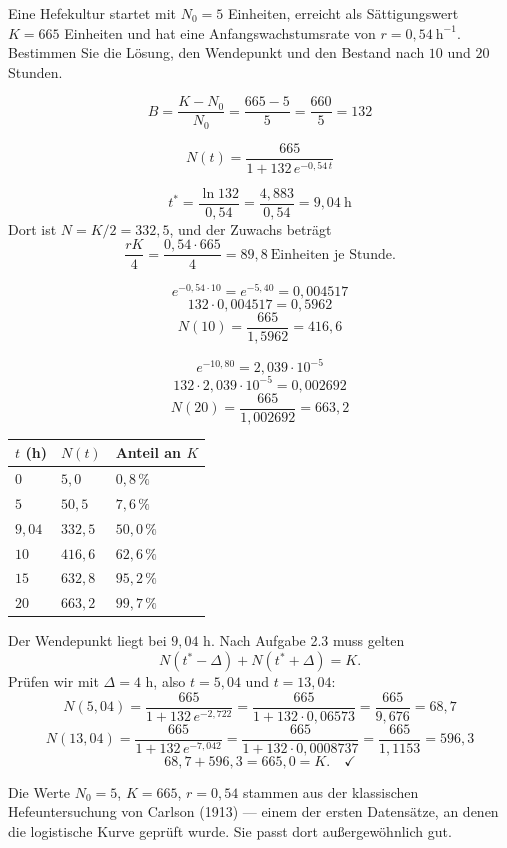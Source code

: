 \begin{aufgabe}
Eine Hefekultur startet mit $N_0 = 5$ Einheiten, erreicht als Sättigungswert $K = 665$ Einheiten und hat eine Anfangswachstumsrate von $r = 0{,}54\ \mathrm{h}^{-1}$. Bestimmen Sie die Lösung, den Wendepunkt und den Bestand nach $10$ und $20$ Stunden.

\loesung
{}
\[ B = \frac{K-N_0}{N_0} = \frac{665-5}{5} = \frac{660}{5} = 132 \]

\[ N(t) = \frac{665}{1 + 132\,e^{-0{,}54\,t}} \]

\[ t^{*} = \frac{\ln 132}{0{,}54} = \frac{4{,}883}{0{,}54} = 9{,}04\ \text{h} \]
Dort ist $N = K/2 = 332{,}5$, und der Zuwachs beträgt
\[ \frac{rK}{4} = \frac{0{,}54 \cdot 665}{4} = 89{,}8 \ \text{Einheiten je Stunde} . \]

\[ e^{-0{,}54 \cdot 10} = e^{-5{,}40} = 0{,}004517 \]
\[ 132 \cdot 0{,}004517 = 0{,}5962 \]
\[ N(10) = \frac{665}{1{,}5962} = 416{,}6 \]

\[ e^{-10{,}80} = 2{,}039\cdot10^{-5} \]
\[ 132 \cdot 2{,}039\cdot10^{-5} = 0{,}002692 \]
\[ N(20) = \frac{665}{1{,}002692} = 663{,}2 \]

\begin{center}
\renewcommand{\arraystretch}{1.45}
\begin{tabular}{@{}P{1.8cm}P{2.0cm}P{2.6cm}@{}}
\toprule
$t$ (h) & $N(t)$ & \textbf{Anteil an $K$}\\
\midrule
$0$ & $5{,}0$ & $0{,}8\,\%$\\
$5$ & $50{,}5$ & $7{,}6\,\%$\\
$9{,}04$ & $332{,}5$ & $50{,}0\,\%$\\
$10$ & $416{,}6$ & $62{,}6\,\%$\\
$15$ & $632{,}8$ & $95{,}2\,\%$\\
$20$ & $663{,}2$ & $99{,}7\,\%$\\
\bottomrule
\end{tabular}
\end{center}

Der Wendepunkt liegt bei $9{,}04$ h. Nach Aufgabe 2.3 muss gelten
\[ N(t^*-\Delta) + N(t^*+\Delta) = K . \]
Prüfen wir mit $\Delta = 4$ h, also $t = 5{,}04$ und $t = 13{,}04$:
\[ N(5{,}04) = \frac{665}{1+132\,e^{-2{,}722}} = \frac{665}{1+132\cdot0{,}06573} = \frac{665}{9{,}676} = 68{,}7 \]
\[ N(13{,}04) = \frac{665}{1+132\,e^{-7{,}042}} = \frac{665}{1+132\cdot0{,}0008737} = \frac{665}{1{,}1153} = 596{,}3 \]
\[ 68{,}7 + 596{,}3 = 665{,}0 = K . \quad \checkmark \]

Die Werte $N_0 = 5$, $K = 665$, $r = 0{,}54$ stammen aus der klassischen Hefeuntersuchung von Carlson (1913) --- einem der ersten Datensätze, an denen die logistische Kurve geprüft wurde. Sie passt dort außergewöhnlich gut.
\end{aufgabe}

